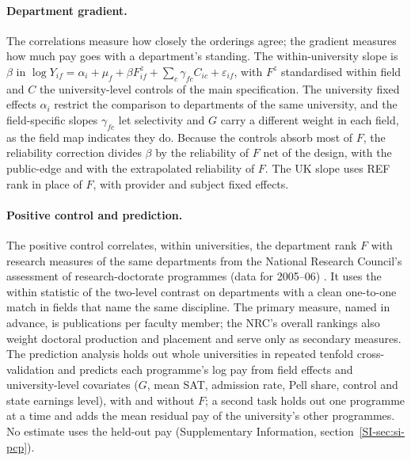 \documentclass[11pt]{article}
\newcommand{\SIsec}[1]{Supplementary Information, section~\ref{SI-#1}}
\begin{document}
\paragraph{Department gradient.} The correlations measure how closely the orderings agree; the gradient measures how
much pay goes with a department's standing. The within-university slope is $\beta$ in $\log Y_{if}=\alpha_i+\mu_f+\beta
F^{z}_{if}+\sum_c\gamma_{fc}C_{ic}+\varepsilon_{if}$, with $F^{z}$ standardised within field and $C$ the
university-level controls of the main specification. The university fixed effects $\alpha_i$ restrict the comparison
to departments of the same university, and the field-specific slopes $\gamma_{fc}$ let selectivity and $G$ carry a
different weight in each field, as the field map indicates they do. Because the controls absorb most of $F$, the
reliability correction divides $\beta$ by the reliability of $F$ net of the design, with the public-edge and with the
extrapolated reliability of $F$. The UK slope uses REF rank in place of $F$, with provider and subject fixed effects.

\paragraph{Positive control and prediction.} The positive control correlates, within universities, the department
rank $F$ with research measures of the same departments from the National Research Council's assessment of
research-doctorate programmes (data for 2005--06) \citep{nrc2011data}. It uses the within statistic of the two-level
contrast on departments with a clean one-to-one match in fields that name the same discipline. The primary measure,
named in advance, is publications per faculty member; the NRC's overall rankings also weight doctoral production and
placement and serve only as secondary measures. The prediction analysis holds out whole universities in repeated
tenfold cross-validation and predicts each programme's log pay from field effects and university-level covariates
($G$, mean SAT, admission rate, Pell share, control and state earnings level), with and without $F$; a second task holds
out one programme at a time and adds the mean residual pay of the university's other programmes. No estimate uses the
held-out pay (\SIsec{sec:si-pcp}).
\end{document}
